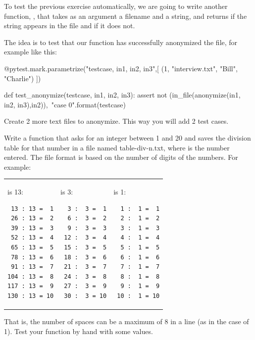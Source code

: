 \begin{exercise}
To test the previous exercise automatically, we are going to write another function, , that takes as an argument a filename and a string, and returns  if the string appears in the file and  if it does not.

The idea is to test that our  function has successfully anonymized the file, for example like this:

\begin{python}
@pytest.mark.parametrize("testcase, in1, in2, in3",[
(1, "interview.txt", "Bill", "Charlie")
])              

def test_anonymize(testcase, in1, in2, in3):
    assert not (in_file(anonymize(in1, in2, in3),in2)),\
           "case {0}".format(testcase)
\end{python}

Create 2 more text files to anonymize. This way you will add 2 test cases.

\end{exercise}



\begin{exercise} 
Write a function that asks for an integer  between 1 and 20 and saves the division table for that number in a file named table-div-n.txt, where  is the number entered. The file format is based on the number of digits of the numbers. For example:

\begin{tabular}{p{3cm}p{3cm}p{3cm}}

\pythoninline{n} is 13:

\begin{verbatim}
 13 : 13 =  1
 26 : 13 =  2
 39 : 13 =  3
 52 : 13 =  4
 65 : 13 =  5
 78 : 13 =  6
 91 : 13 =  7
104 : 13 =  8
117 : 13 =  9
130 : 13 = 10
\end{verbatim}
&
\pythoninline{n} is 3:

\begin{verbatim}
  3 :  3 =  1
  6 :  3 =  2
  9 :  3 =  3
 12 :  3 =  4
 15 :  3 =  5
 18 :  3 =  6
 21 :  3 =  7
 24 :  3 =  8
 27 :  3 =  9
 30 :  3 = 10
\end{verbatim}

& 
\pythoninline{n} is 1:

\begin{verbatim}
  1 :  1 =  1
  2 :  1 =  2
  3 :  1 =  3
  4 :  1 =  4
  5 :  1 =  5
  6 :  1 =  6
  7 :  1 =  7
  8 :  1 =  8
  9 :  1 =  9
 10 :  1 = 10
\end{verbatim}
\end{tabular}

That is, the number of spaces can be a maximum of 8 in a line (as in the case of 1). Test your function by hand with some values.


\end{exercise}

